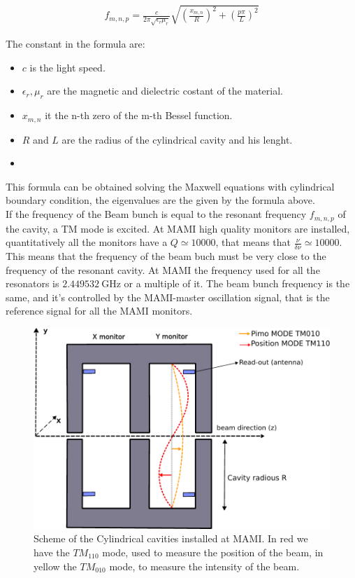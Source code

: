 \begin{align*}
f_{m,n,p} = \frac{c}{2\pi \sqrt{\epsilon_{r} \mu_{r}}} \sqrt{(\frac{x_{m,n}}{R})^{2} + (\frac{p \pi}{L})^{2}}
\end{align*}

The constant in the formula are:

\begin{itemize}
\item $c$ is the light speed.
\item $\epsilon_{r}, \mu_{r}$ are the magnetic and dielectric costant of the material.
\item $x_{m,n}$ it the n-th zero of the m-th Bessel function.
\item $R$ and $L$ are the radius of the cylindrical cavity and his lenght.
\item {}
\end{itemize}

This formula can be obtained solving the Maxwell equations with cylindrical boundary condition, the eigenvalues are the given by the formula above. \\
If the frequency of the Beam bunch is equal to the resonant frequency $f_{m,n,p}$ of the cavity, a TM mode is excited. At MAMI high quality monitors are installed, quantitatively all the monitors have a $Q \simeq 10000$, that means that $\frac{\nu}{\delta \nu} \simeq 10000$. This means that the frequency of the beam buch must be very close to the frequency of the resonant cavity. At MAMI the frequency used for all the resonators is $\SI{2.449532}{\giga \hertz}$ or a multiple of it. The beam bunch frequency is the same, and it's controlled by the MAMI-master oscillation signal, that is the reference signal for all the MAMI monitors.

\begin{figure}[hbtp]
\centering
\includegraphics[width = 0.6 \textwidth]{ExperimentalSetup/Monitors.pdf}
\caption{Scheme of the Cylindrical cavities installed at MAMI. In red we have the $TM_{110}$ mode, used to measure the position of the beam, in yellow the $TM_{010}$ mode, to measure the intensity of the beam.}
\end{figure}

